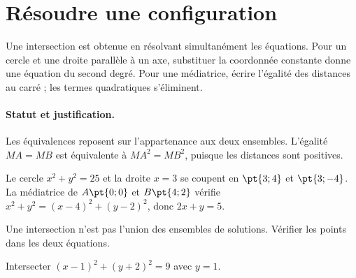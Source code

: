 \section{Résoudre une configuration}\label{C07-U4}
\begin{keypoint}
Une intersection est obtenue en résolvant simultanément les équations. Pour un cercle et une droite parallèle à un axe, substituer la coordonnée constante donne une équation du second degré. Pour une médiatrice, écrire l’égalité des distances au carré ; les termes quadratiques s’éliminent.
\end{keypoint}
\paragraph{Statut et justification.} Les équivalences reposent sur l’appartenance aux deux ensembles. L’égalité $MA=MB$ est équivalente à $MA^2=MB^2$, puisque les distances sont positives.
\begin{example}Le cercle $x^2+y^2=25$ et la droite $x=3$ se coupent en $\pt{3;4}$ et $\pt{3;-4}$. La médiatrice de $A\pt{0;0}$ et $B\pt{4;2}$ vérifie $x^2+y^2=(x-4)^2+(y-2)^2$, donc $2x+y=5$.\end{example}\label{C07-EX4}
\begin{pitfall}Une intersection n’est pas l’union des ensembles de solutions. Vérifier les points dans les deux équations.\end{pitfall}
\begin{application}Intersecter $(x-1)^2+(y+2)^2=9$ avec $y=1$.\end{application}\label{C07-AP4}
\mxnewpage
